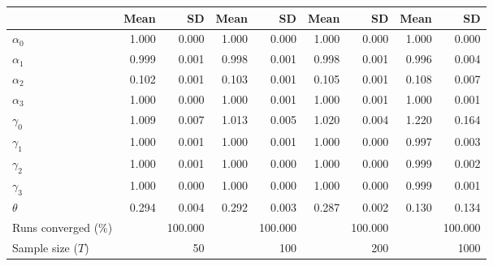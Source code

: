 
\begin{tabular}[t]{lrrrrrrrr}
\toprule
  & Mean & SD & Mean  & SD  & Mean   & SD   & Mean    & SD   \\
\midrule
$\alpha_{0}$ & 1.000 & 0.000 & 1.000 & 0.000 & 1.000 & 0.000 & 1.000 & 0.000\\
$\alpha_{1}$ & 0.999 & 0.001 & 0.998 & 0.001 & 0.998 & 0.001 & 0.996 & 0.004\\
$\alpha_{2}$ & 0.102 & 0.001 & 0.103 & 0.001 & 0.105 & 0.001 & 0.108 & 0.007\\
$\alpha_{3}$ & 1.000 & 0.000 & 1.000 & 0.001 & 1.000 & 0.001 & 1.000 & 0.001\\
$\gamma_{0}$ & 1.009 & 0.007 & 1.013 & 0.005 & 1.020 & 0.004 & 1.220 & 0.164\\
$\gamma_{1}$ & 1.000 & 0.001 & 1.000 & 0.001 & 1.000 & 0.000 & 0.997 & 0.003\\
$\gamma_{2}$ & 1.000 & 0.001 & 1.000 & 0.000 & 1.000 & 0.000 & 0.999 & 0.002\\
$\gamma_{3}$ & 1.000 & 0.000 & 1.000 & 0.000 & 1.000 & 0.000 & 0.999 & 0.001\\
$\theta$ & 0.294 & 0.004 & 0.292 & 0.003 & 0.287 & 0.002 & 0.130 & 0.134\\
Runs converged (\%) &  & 100.000 &  & 100.000 &  & 100.000 &  & 100.000\\
Sample size ($T$) &  & 50 &  & 100 &  & 200 &  & 1000\\
\bottomrule
\end{tabular}
